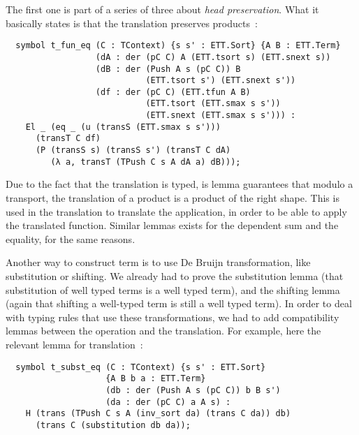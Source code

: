 The first one is part of a series of three about \emph{head preservation}. What
it basically states is that the translation preserves products~:

\begin{lstlisting}
  symbol t_fun_eq (C : TContext) {s s' : ETT.Sort} {A B : ETT.Term}
                  (dA : der (pC C) A (ETT.tsort s) (ETT.snext s))
                  (dB : der (Push A s (pC C)) B
                            (ETT.tsort s') (ETT.snext s'))
                  (df : der (pC C) (ETT.tfun A B)
                            (ETT.tsort (ETT.smax s s'))
                            (ETT.snext (ETT.smax s s'))) :
    El _ (eq _ (u (transS (ETT.smax s s')))
      (transT C df)
      (P (transS s) (transS s') (transT C dA)
         (λ a, transT (TPush C s A dA a) dB)));
\end{lstlisting}

Due to the fact that the translation is typed, is lemma guarantees that modulo a
transport, the translation of a product is a product of the right shape. This is
used in the translation to translate the application, in order to be able to
apply the translated function. Similar lemmas exists for the dependent sum and
the equality, for the same reasons.

Another way to construct term is to use De Bruijn transformation, like
substitution or shifting. We already had to prove the substitution lemma (that
substitution of well typed terms is a well typed term), and the shifting lemma
(again that shifting a well-typed term is still a well typed term). In order to
deal with typing rules that use these transformations, we had to add
compatibility lemmas between the operation and the translation. For example,
here the relevant lemma for translation~:

\begin{lstlisting}
  symbol t_subst_eq (C : TContext) {s s' : ETT.Sort}
                    {A B b a : ETT.Term}
                    (db : der (Push A s (pC C)) b B s')
                    (da : der (pC C) a A s) :
    H (trans (TPush C s A (inv_sort da) (trans C da)) db)
      (trans C (substitution db da));
\end{lstlisting}
